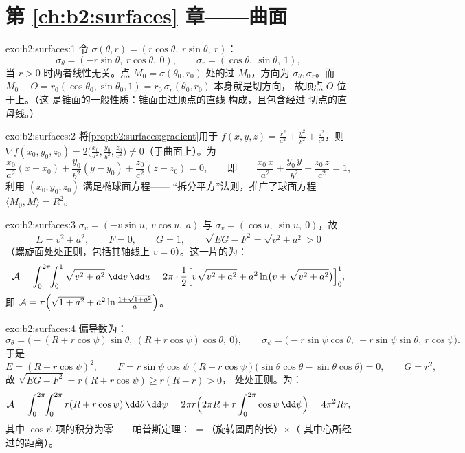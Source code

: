 \section*{第 \ref{ch:b2:surfaces} 章——曲面}

\begin{solution}{exo:b2:surfaces:1}
令 $\sigma(\theta, r) = (r\cos\theta,\ r\sin\theta,\ r)$：
\[
\sigma_\theta = (-r\sin\theta,\ r\cos\theta,\ 0),
\qquad
\sigma_r = (\cos\theta,\ \sin\theta,\ 1),
\]
当 $r > 0$ 时两者线性无关。点 $M_0 =
\sigma(\theta_0, r_0)$ 处的过 $M_0$，方向为
$\sigma_\theta, \sigma_r$。而 $M_0 - O = r_0(\cos\theta_0,
\sin\theta_0, 1) = r_0\,\sigma_r(\theta_0, r_0)$ 本身就是切方向，
故顶点 $O$ 位于上。（这
是锥面的一般性质：锥面由过顶点的直线
构成，且包含经过
切点的直母线。）
\end{solution}

\begin{solution}{exo:b2:surfaces:2}
将\cref{prop:b2:surfaces:gradient}用于 $f(x,y,z) =
\frac{x^2}{a^2} + \frac{y^2}{b^2} + \frac{z^2}{c^2}$，则 $\nabla
f(x_0,y_0,z_0) = 2\bigl(\frac{x_0}{a^2}, \frac{y_0}{b^2},
\frac{z_0}{c^2}\bigr) \neq 0$（于曲面上）。为
\[
\frac{x_0}{a^2}(x - x_0) + \frac{y_0}{b^2}(y - y_0)
+ \frac{z_0}{c^2}(z - z_0) = 0,
\qquad\text{即}\qquad
\frac{x_0\,x}{a^2} + \frac{y_0\,y}{b^2} + \frac{z_0\,z}{c^2} = 1,
\]
利用 $(x_0, y_0, z_0)$ 满足椭球面方程——
“拆分平方”法则，推广了球面方程 $\langle
M_0, M \rangle = R^2$。
\end{solution}

\begin{solution}{exo:b2:surfaces:3}
$\sigma_u = (-v\sin u,\ v\cos u,\ a)$ 与 $\sigma_v = (\cos u,\
\sin u,\ 0)$，故
\[
E = v^2 + a^2, \qquad F = 0, \qquad G = 1,
\qquad
\sqrt{EG - F^2} = \sqrt{v^2 + a^2} > 0
\]
（螺旋面处处正则，包括其轴线上 $v =
0$）。这一片的为：
\[
\mathcal{A} = \int_0^{2\pi}\!\!\int_0^1
\sqrt{v^2 + a^2}\;\dd v\,\dd u
= 2\pi\cdot\frac12\Bigl[v\sqrt{v^2 + a^2}
+ a^2\ln\bigl(v + \sqrt{v^2 + a^2}\bigr)\Bigr]_0^1 ,
\]
即 $\mathcal{A} = \pi\Bigl(\sqrt{1 + a^2} +
a^2\ln\frac{1 + \sqrt{1 + a^2}}{a}\Bigr)$。
\end{solution}

\begin{solution}{exo:b2:surfaces:4}
偏导数为：
\[
\sigma_\theta = \bigl(-(R + r\cos\psi)\sin\theta,\
(R + r\cos\psi)\cos\theta,\ 0\bigr),
\qquad
\sigma_\psi = \bigl(-r\sin\psi\cos\theta,\
-r\sin\psi\sin\theta,\ r\cos\psi\bigr).
\]
于是
\[
E = (R + r\cos\psi)^2,
\qquad
F = r\sin\psi\cos\psi\,(R + r\cos\psi)
\bigl(\sin\theta\cos\theta - \sin\theta\cos\theta\bigr) = 0,
\qquad
G = r^2 ,
\]
故 $\sqrt{EG - F^2} = r(R + r\cos\psi) \geq r(R - r) > 0$，
处处正则。为：
\[
\mathcal{A}
= \int_0^{2\pi}\!\!\int_0^{2\pi} r(R + r\cos\psi)
\,\dd\theta\,\dd\psi
= 2\pi r \Bigl(2\pi R + r\int_0^{2\pi}\cos\psi\,\dd\psi\Bigr)
= 4\pi^2 R r ,
\]
其中 $\cos\psi$ 项的积分为零——帕普斯定理：\omterm{def:b2:surfaces:area}{面积}
$=$（旋转圆周的长）$\times$（
其中心所经过的距离）。
\end{solution}

